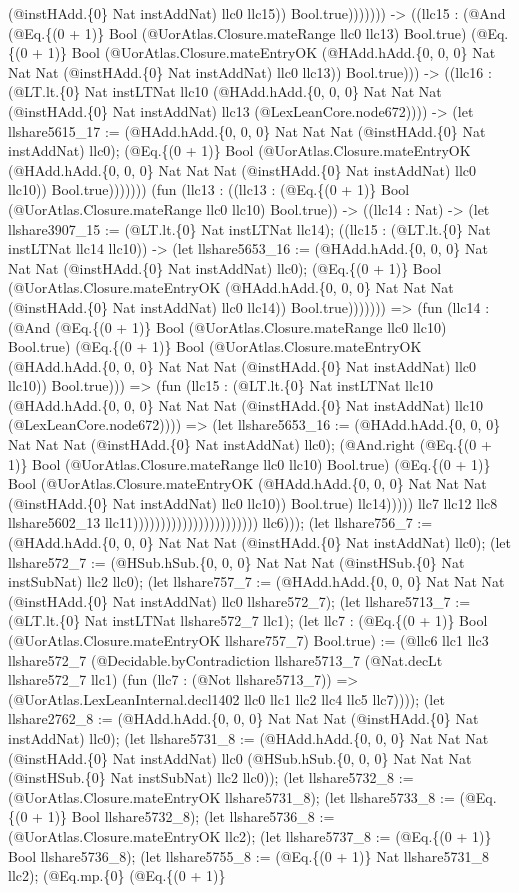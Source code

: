 \documentclass[11pt]{article}
\begin{document}
(@instHAdd.\{0\} Nat instAddNat) llc0 llc15)) Bool.true))))))) -> ((llc15 : (@And (@Eq.\{(0 + 1)\} Bool (@UorAtlas.Closure.mateRange llc0 llc13) Bool.true) (@Eq.\{(0 + 1)\} Bool (@UorAtlas.Closure.mateEntryOK (@HAdd.hAdd.\{0, 0, 0\} Nat Nat Nat (@instHAdd.\{0\} Nat instAddNat) llc0 llc13)) Bool.true))) -> ((llc16 : (@LT.lt.\{0\} Nat instLTNat llc10 (@HAdd.hAdd.\{0, 0, 0\} Nat Nat Nat (@instHAdd.\{0\} Nat instAddNat) llc13 (@LexLeanCore.node672)))) -> (let llshare5615\_17 := (@HAdd.hAdd.\{0, 0, 0\} Nat Nat Nat (@instHAdd.\{0\} Nat instAddNat) llc0); (@Eq.\{(0 + 1)\} Bool (@UorAtlas.Closure.mateEntryOK (@HAdd.hAdd.\{0, 0, 0\} Nat Nat Nat (@instHAdd.\{0\} Nat instAddNat) llc0 llc10)) Bool.true))))))) (fun (llc13 : ((llc13 : (@Eq.\{(0 + 1)\} Bool (@UorAtlas.Closure.mateRange llc0 llc10) Bool.true)) -> ((llc14 : Nat) -> (let llshare3907\_15 := (@LT.lt.\{0\} Nat instLTNat llc14); ((llc15 : (@LT.lt.\{0\} Nat instLTNat llc14 llc10)) -> (let llshare5653\_16 := (@HAdd.hAdd.\{0, 0, 0\} Nat Nat Nat (@instHAdd.\{0\} Nat instAddNat) llc0); (@Eq.\{(0 + 1)\} Bool (@UorAtlas.Closure.mateEntryOK (@HAdd.hAdd.\{0, 0, 0\} Nat Nat Nat (@instHAdd.\{0\} Nat instAddNat) llc0 llc14)) Bool.true))))))) => (fun (llc14 : (@And (@Eq.\{(0 + 1)\} Bool (@UorAtlas.Closure.mateRange llc0 llc10) Bool.true) (@Eq.\{(0 + 1)\} Bool (@UorAtlas.Closure.mateEntryOK (@HAdd.hAdd.\{0, 0, 0\} Nat Nat Nat (@instHAdd.\{0\} Nat instAddNat) llc0 llc10)) Bool.true))) => (fun (llc15 : (@LT.lt.\{0\} Nat instLTNat llc10 (@HAdd.hAdd.\{0, 0, 0\} Nat Nat Nat (@instHAdd.\{0\} Nat instAddNat) llc10 (@LexLeanCore.node672)))) => (let llshare5653\_16 := (@HAdd.hAdd.\{0, 0, 0\} Nat Nat Nat (@instHAdd.\{0\} Nat instAddNat) llc0); (@And.right (@Eq.\{(0 + 1)\} Bool (@UorAtlas.Closure.mateRange llc0 llc10) Bool.true) (@Eq.\{(0 + 1)\} Bool (@UorAtlas.Closure.mateEntryOK (@HAdd.hAdd.\{0, 0, 0\} Nat Nat Nat (@instHAdd.\{0\} Nat instAddNat) llc0 llc10)) Bool.true) llc14))))) llc7 llc12 llc8 llshare5602\_13 llc11))))))))))))))))))))))) llc6))); (let llshare756\_7 := (@HAdd.hAdd.\{0, 0, 0\} Nat Nat Nat (@instHAdd.\{0\} Nat instAddNat) llc0); (let llshare572\_7 := (@HSub.hSub.\{0, 0, 0\} Nat Nat Nat (@instHSub.\{0\} Nat instSubNat) llc2 llc0); (let llshare757\_7 := (@HAdd.hAdd.\{0, 0, 0\} Nat Nat Nat (@instHAdd.\{0\} Nat instAddNat) llc0 llshare572\_7); (let llshare5713\_7 := (@LT.lt.\{0\} Nat instLTNat llshare572\_7 llc1); (let llc7 : (@Eq.\{(0 + 1)\} Bool (@UorAtlas.Closure.mateEntryOK llshare757\_7) Bool.true) := (@llc6 llc1 llc3 llshare572\_7 (@Decidable.byContradiction llshare5713\_7 (@Nat.decLt llshare572\_7 llc1) (fun (llc7 : (@Not llshare5713\_7)) => (@UorAtlas.LexLeanInternal.decl1402 llc0 llc1 llc2 llc4 llc5 llc7)))); (let llshare2762\_8 := (@HAdd.hAdd.\{0, 0, 0\} Nat Nat Nat (@instHAdd.\{0\} Nat instAddNat) llc0); (let llshare5731\_8 := (@HAdd.hAdd.\{0, 0, 0\} Nat Nat Nat (@instHAdd.\{0\} Nat instAddNat) llc0 (@HSub.hSub.\{0, 0, 0\} Nat Nat Nat (@instHSub.\{0\} Nat instSubNat) llc2 llc0)); (let llshare5732\_8 := (@UorAtlas.Closure.mateEntryOK llshare5731\_8); (let llshare5733\_8 := (@Eq.\{(0 + 1)\} Bool llshare5732\_8); (let llshare5736\_8 := (@UorAtlas.Closure.mateEntryOK llc2); (let llshare5737\_8 := (@Eq.\{(0 + 1)\} Bool llshare5736\_8); (let llshare5755\_8 := (@Eq.\{(0 + 1)\} Nat llshare5731\_8 llc2); (@Eq.mp.\{0\} (@Eq.\{(0 + 1)\} 
\end{document}

